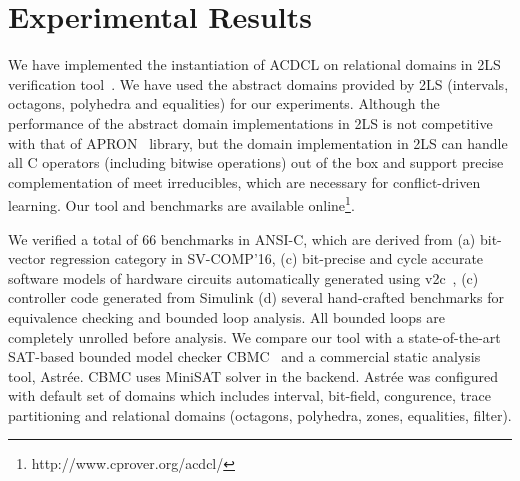 \section{Experimental Results}
We have implemented the instantiation of ACDCL on relational domains
in 2LS verification tool~\cite{2ls}.  We have used the abstract domains
provided by 2LS (intervals, octagons, polyhedra and equalities) for our
experiments. Although the performance of the abstract domain implementations 
in 2LS is not competitive with that of APRON~\cite{apron} library, but 
the domain implementation in 2LS can handle all C operators 
(including bitwise operations) out of the box and support precise
complementation of meet irreducibles, which are necessary for conflict-driven 
learning. Our tool and benchmarks are available online\footnote{http://www.cprover.org/acdcl/}.

We verified a total of 66 benchmarks in ANSI-C, which are derived from 
(a) bit-vector regression category in SV-COMP'16, (c) bit-precise and 
cycle accurate software models of hardware circuits automatically 
generated using v2c~\cite{mtk2016}, (c) controller code generated 
from Simulink (d) several hand-crafted benchmarks for equivalence 
checking and bounded loop analysis.  All bounded loops are completely 
unrolled before analysis.  We compare our tool with a state-of-the-art 
SAT-based bounded model checker CBMC~\cite{cbmc} and a commercial 
static analysis tool, Astr{\'e}e.  CBMC uses MiniSAT solver in the backend.  
Astr{\'e}e was configured with default set of domains which includes 
interval, bit-field, congurence, trace partitioning and relational 
domains (octagons, polyhedra, zones, equalities, filter).   


